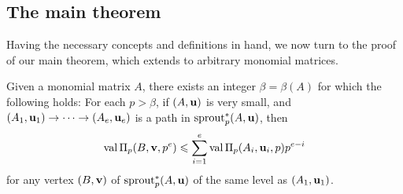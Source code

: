 \documentclass{amsart}
\begin{document}
\subsection{The main theorem}

Having the necessary concepts and definitions in hand, we now turn to the proof of our main theorem, which extends  to arbitrary monomial matrices.

\begin{lemma}\label{lem: upper bound for higher mu}
   Given a monomial matrix $A$, there exists an integer $\beta= \beta(A)$ for which the following holds\textup:
   For each $p>\beta$, if $(A, \mathbf{u})$ is very small, and $(A_1, \mathbf{u}_1) \to \cdots \to (A_e, \mathbf{u}_e)$ is a path in $\operatorname{sprout}^{\ast}_p(A,\mathbf{u})$,  then
   \[
      \operatorname{val} \Pi_p(B, \mathbf{v}, p^e) \leqslant \sum_{i=1}^e \operatorname{val} \Pi_p(A_i, \mathbf{u}_i, p)p^{e-i}
   \]
   for any vertex $(B, \mathbf{v})$ of $\operatorname{sprout}^{\ast}_p(A,\mathbf{u})$ of the same level as $(A_1, \mathbf{u}_1)$.
\end{lemma}
\end{document}
